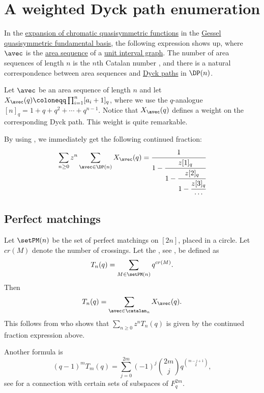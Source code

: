 

\section[unitIntervalAO]{A weighted Dyck path enumeration}

In the \hyperref[chromaticQuasisymmetricGesselExpansion]{expansion of
chromatic quasisymmetric functions} in the \hyperref[gessel]{Gessel
quasisymmetric fundamental basis}, the following expression shows up, where
$\avec$ is the \hyperref[areaSequence]{area sequence} of a
\hyperref[chromaticQuasisymmetricUnitIntervalGraph]{unit interval graph}.
The number of area sequences of length $n$ is the $n$th Catalan
number , and there is a natural correspondence between area sequences and
\hyperref[qtCatalan]{Dyck paths} in $\DP(n)$.

Let $\avec$ be an area sequence of length $n$ and let
$X_{\avec}(q) \coloneqq \prod_{i=1}^n [a_i+1]_q$,
where we use the $q$-analogue $[n]_q = 1+q+q^2+\dotsb+q^{n-1}$.
Notice that $X_{\avec}(q)$ defines a weight on the corresponding Dyck path.
This weight is quite remarkable.

By using \cite[Thm.~1]{Flajolet2006}, we immediately get the following
continued fraction:
\[
\sum_{n\geq 0} z^n \sum_{\avec \in \DP(n) } X_{\avec}(q) =
\cfrac{1}{
1 - \cfrac{z[1]_q}{
1 - \cfrac{z[2]_q}{
1 - \cfrac{z[3]_q}{
\cdots
}}}}
\]

\subsection[aoPerfectMatchings]{Perfect matchings}

Let $\setPM(n)$ be the set of perfect matchings on $[2n]$, placed in a circle.
Let $cr(M)$ denote the number of crossings.  Let the
\label{touchardRiordanPolynomialDefinition},
see , be defined as
\[
T_n(q) = \sum_{M \in \setPM(n)} q^{cr(M)}.
\]
Then
\[
T_n(q) = \sum_{\avec \in \catalan_n} X_{\avec}(q).
\]
This follows from \cite{Read1979} who shows that $\sum_{n \geq 0} z^n T_n(q)$
is given by the continued fraction expression above.


Another formula is
\[
 (q-1)^m T_m(q) = \sum_{j=0}^{2m} (-1)^j \binom{2m}{j} q^{\binom{m-j+1}{2}},
\]
see \cite{PrasadRam2022x} for a connection with certain sets of subspaces of $F_q^{2m}$.

